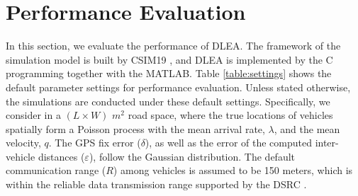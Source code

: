 \documentclass[letterpaper, 10 pt, conference]{ieeeconf}
\begin{document}
\section{Performance Evaluation}\label{pe}
In this section, we evaluate the performance of DLEA. The framework of the simulation model is built by CSIM19 \cite{schwetman2001csim19}, and DLEA is implemented by the C programming together with the MATLAB. Table \ref{table:settings} shows the default parameter settings for  performance evaluation. Unless stated otherwise, the simulations are conducted under these default settings. Specifically, we consider in a $(L \times W)$ $m^2$ road space, where the true locations of vehicles spatially form a Poisson process with the mean arrival rate, $\lambda$, and the mean velocity, $q$. The GPS fix error ($\delta $), as well as the error of the computed inter-vehicle distances ($\varepsilon $), follow the Gaussian distribution.  The default  communication range ($R$) among vehicles is assumed to be 150 meters, which is within the reliable data transmission range supported by the DSRC \cite{ma2012design}.
\end{document}
